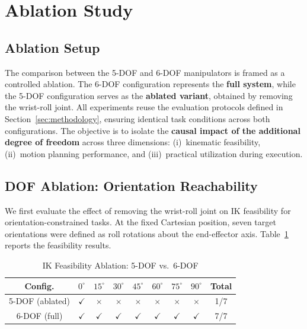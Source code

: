 \documentclass[conference]{IEEEtran}
\begin{document}
	
	\section{Ablation Study}
	\label{sec:ablation}
	
	\subsection{Ablation Setup}
	
	The comparison between the 5-DOF and 6-DOF manipulators is framed as
	a controlled ablation. The 6-DOF configuration represents the
	\textbf{full system}, while the 5-DOF configuration serves as the
	\textbf{ablated variant}, obtained by removing the wrist-roll joint.
	All experiments reuse the evaluation protocols defined in
	Section~\ref{sec:methodology}, ensuring identical task conditions
	across both configurations. The objective is to isolate the
	\textbf{causal impact of the additional degree of freedom} across
	three dimensions: (i)~kinematic feasibility, (ii)~motion planning
	performance, and (iii)~practical utilization during execution.
	
	\subsection{DOF Ablation: Orientation Reachability}
	
	We first evaluate the effect of removing the wrist-roll joint on IK
	feasibility for orientation-constrained tasks. At the fixed Cartesian
	position, seven target orientations were defined as roll rotations
	about the end-effector axis. Table~\ref{tab:ik_ablation} reports the
	feasibility results.
	
	\begin{table}[t]
		\centering
		\caption{IK Feasibility Ablation: 5-DOF vs.\ 6-DOF}
		\label{tab:ik_ablation}
		\begin{tabular}{c|ccccccc|c}
			\hline
			\textbf{Config.} & $0^\circ$ & $15^\circ$ & $30^\circ$ & $45^\circ$ & $60^\circ$ & $75^\circ$ & $90^\circ$ & \textbf{Total} \\
			\hline
			5-DOF (ablated) & $\checkmark$ & $\times$ & $\times$ & $\times$ & $\times$ & $\times$ & $\times$ & 1/7 \\
			6-DOF (full)    & $\checkmark$ & $\checkmark$ & $\checkmark$ & $\checkmark$ & $\checkmark$ & $\checkmark$ & $\checkmark$ & 7/7 \\
			\hline
		\end{tabular}
	\end{table}
	
\end{document}
